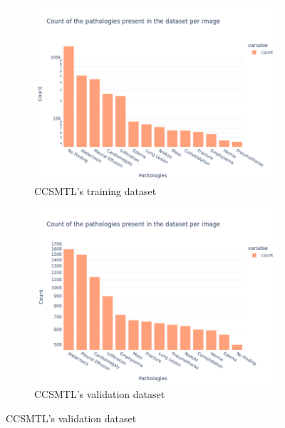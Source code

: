 \documentclass[11pt]{article}
\begin{document}
    \begin{figure}[h!]
         \centering
         \begin{subfigure}[b]{0.48\linewidth}
             \centering
             \includegraphics[width=\linewidth]{plots/histogram_ciusss_train}
             \caption{CCSMTL's training dataset}
             \vspace{4ex}
             \label{fig:histogram_ciusss_train}
         \end{subfigure}
         \hfill
         \begin{subfigure}[b]{0.48\linewidth}
             \centering
             \includegraphics[width=\linewidth]{plots/histogram_ciusss_valid}
             \caption{CCSMTL's validation dataset}
             \vspace{4ex}
             \label{fig:histogram_ciusss_valid}
         \end{subfigure}



\end{figure}
\end{document}
